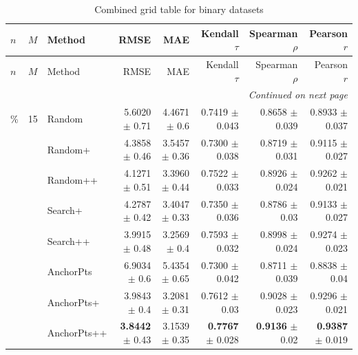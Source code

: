 \footnotesize
\setlength{\tabcolsep}{2pt}
\renewcommand{\arraystretch}{1.05}
\setlength{\LTpre}{0pt}
\setlength{\LTpost}{0pt}
\setlength{\LTleft}{\fill}
\setlength{\LTright}{\fill}
\begin{longtable}{llp{}rrrrr}
\caption{Combined grid table for binary datasets}\label{tab:combined\_grid\_binary}\\
\toprule
$n$ & $M$ & Method & RMSE & MAE & Kendall $\tau$ & Spearman $\rho$ & Pearson $r$ \\
\midrule
\endfirsthead
\toprule
$n$ & $M$ & Method & RMSE & MAE & Kendall $\tau$ & Spearman $\rho$ & Pearson $r$ \\
\midrule
\endhead
\midrule
\multicolumn{8}{r}{\emph{Continued on next page}} \\
\midrule
\endfoot
\bottomrule
\endlastfoot
5\% & 15 & Random & 5.6020 {\scriptsize $\pm$ 0.71} & 4.4671 {\scriptsize $\pm$ 0.6} & 0.7419 {\scriptsize $\pm$ 0.043} & 0.8658 {\scriptsize $\pm$ 0.039} & 0.8933 {\scriptsize $\pm$ 0.037} \\
 &  & Random+ & 4.3858 {\scriptsize $\pm$ 0.46} & 3.5457 {\scriptsize $\pm$ 0.36} & 0.7300 {\scriptsize $\pm$ 0.038} & 0.8719 {\scriptsize $\pm$ 0.031} & 0.9115 {\scriptsize $\pm$ 0.027} \\
 &  & Random++ & 4.1271 {\scriptsize $\pm$ 0.51} & 3.3960 {\scriptsize $\pm$ 0.44} & 0.7522 {\scriptsize $\pm$ 0.033} & 0.8926 {\scriptsize $\pm$ 0.024} & 0.9262 {\scriptsize $\pm$ 0.021} \\
 &  & Search+ & 4.2787 {\scriptsize $\pm$ 0.42} & 3.4047 {\scriptsize $\pm$ 0.33} & 0.7350 {\scriptsize $\pm$ 0.036} & 0.8786 {\scriptsize $\pm$ 0.03} & 0.9133 {\scriptsize $\pm$ 0.027} \\
 &  & Search++ & 3.9915 {\scriptsize $\pm$ 0.48} & 3.2569 {\scriptsize $\pm$ 0.4} & 0.7593 {\scriptsize $\pm$ 0.032} & 0.8998 {\scriptsize $\pm$ 0.024} & 0.9274 {\scriptsize $\pm$ 0.023} \\
 &  & AnchorPts & 6.9034 {\scriptsize $\pm$ 0.6} & 5.4354 {\scriptsize $\pm$ 0.65} & 0.7300 {\scriptsize $\pm$ 0.042} & 0.8711 {\scriptsize $\pm$ 0.039} & 0.8838 {\scriptsize $\pm$ 0.04} \\
 &  & AnchorPts+ & 3.9843 {\scriptsize $\pm$ 0.4} & 3.2081 {\scriptsize $\pm$ 0.31} & 0.7612 {\scriptsize $\pm$ 0.03} & 0.9028 {\scriptsize $\pm$ 0.023} & 0.9296 {\scriptsize $\pm$ 0.021} \\
 &  & AnchorPts++ & \textbf{3.8442} {\scriptsize $\pm$ 0.43} & 3.1539 {\scriptsize $\pm$ 0.35} & \textbf{0.7767} {\scriptsize $\pm$ 0.028} & \textbf{0.9136} {\scriptsize $\pm$ 0.02} & \textbf{0.9387} {\scriptsize $\pm$ 0.019} \\

\end{longtable}
